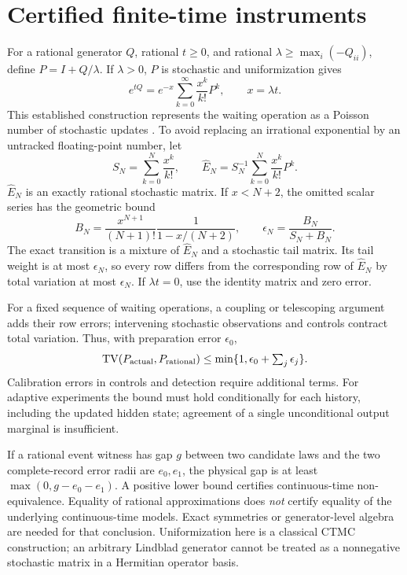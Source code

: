 \section{Certified finite-time instruments}

For a rational generator $Q$, rational $t\geq0$, and rational
$\lambda\geq\max_i(-Q_{ii})$, define $P=I+Q/\lambda$. If $\lambda>0$, $P$
is stochastic and uniformization gives
\begin{equation}
 e^{tQ}=e^{-x}\sum_{k=0}^{\infty}\frac{x^k}{k!}P^k,
 \qquad x=\lambda t.
 \label{eq:continuous-uniformization}
\end{equation}
This established construction represents the waiting operation as a Poisson
number of stochastic updates \cite{physics-uniformization}. To avoid replacing
an irrational exponential by an untracked floating-point number, let
\begin{equation}
 S_N=\sum_{k=0}^N\frac{x^k}{k!},\qquad
 \widehat E_N=S_N^{-1}\sum_{k=0}^N\frac{x^k}{k!}P^k.
\end{equation}
$\widehat E_N$ is an exactly rational stochastic matrix. If $x<N+2$, the
omitted scalar series has the geometric bound
\begin{equation}
 B_N=\frac{x^{N+1}}{(N+1)!}\frac1{1-x/(N+2)},\qquad
 \epsilon_N=\frac{B_N}{S_N+B_N}.
 \label{eq:continuous-radius}
\end{equation}
The exact transition is a mixture of $\widehat E_N$ and a stochastic tail
matrix. Its tail weight is at most $\epsilon_N$, so every row differs from
the corresponding row of $\widehat E_N$ by total variation at most
$\epsilon_N$. If $\lambda t=0$, use the identity matrix and zero error.

For a fixed sequence of waiting operations, a coupling or telescoping argument
adds their row errors; intervening stochastic observations and controls
contract total variation. Thus, with preparation error $\epsilon_0$,
\begin{equation}
 \operatorname{TV}(P_{\rm actual},P_{\rm rational})
 \leq \min\{1,\epsilon_0+\textstyle\sum_j\epsilon_j\}.
 \label{eq:continuous-composition}
\end{equation}
Calibration errors in controls and detection require additional terms.
For adaptive experiments the bound must hold conditionally for each history,
including the updated hidden state; agreement of a single unconditional
output marginal is insufficient.

If a rational event witness has gap $g$ between two candidate laws and the
two complete-record error radii are $e_0,e_1$, the physical gap is at least
$\max(0,g-e_0-e_1)$. A positive lower bound certifies continuous-time
non-equivalence. Equality of rational approximations does \emph{not} certify
equality of the underlying continuous-time models. Exact symmetries or
generator-level algebra are needed for that conclusion. Uniformization here
is a classical CTMC construction; an arbitrary Lindblad generator cannot be
treated as a nonnegative stochastic matrix in a Hermitian operator basis.

